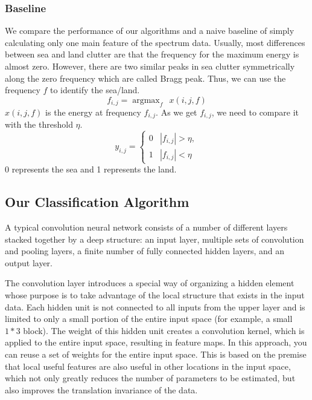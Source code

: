 \subsubsection{Baseline}
We compare the performance of our algorithms and a naive baseline of simply calculating only one main feature of the spectrum data. Usually, most differences between sea and land clutter are that the frequency for the maximum energy is almost zero. However, there are two similar peaks in sea clutter symmetrically along the zero frequency which are called Bragg peak. Thus, we can use the frequency $f$ to identify the sea/land.
\begin{equation}
f_{i, j}= \mathop{\arg\max}_{f} \ \ x(i, j, f)
\end{equation}
$x(i, j, f)$ is the energy at frequency $f_{i, j}$. As we get $f_{i, j}$, we need to compare it with the threshold $\eta$.
\[
y_{i, j}= \left\{\begin{array}{ll}
0&|f_{i, j}| > \eta, \\
1&|f_{i, j}| < \eta
\end{array}
\right.\]
0 represents the sea and 1 represents the land.
\subsection{Our Classification Algorithm}
A typical convolution neural network consists of a number of different layers stacked together by a deep structure: an input layer, multiple sets of convolution and pooling layers, a finite number of fully connected hidden layers, and an output layer.

The convolution layer introduces a special way of organizing a hidden element whose purpose is to take advantage of the local structure that exists in the input data. Each hidden unit is not connected to all inputs from the upper layer and is limited to only a small portion of the entire input space (for example, a small $1*3$ block). The weight of this hidden unit creates a convolution kernel, which is applied to the entire input space, resulting in feature maps. In this approach, you can reuse a set of weights for the entire input space. This is based on the premise that local useful features are also useful in other locations in the input space, which not only greatly reduces the number of parameters to be estimated, but also improves the translation invariance of the data.

